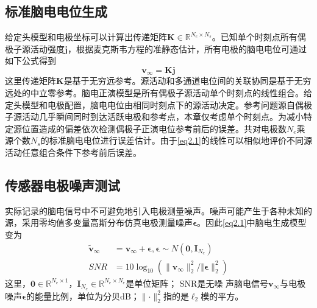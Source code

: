 \subsection{标准脑电电位生成}
给定头模型和电极坐标可以计算出传递矩阵$\mathbf{K}\in{\mathbb{R}^{N_e\times{N_s}}}$。已知单个时刻点所有偶极子源活动强度$\mathbf{j}$，根据麦克斯韦方程的准静态估计，所有电极的脑电电位可通过如下公式得到
\begin{equation}\label{eq2.1}
\mathbf{v}_{\infty}=\mathbf{Kj}
\end{equation}
这里传递矩阵$\mathbf{K}$是基于无穷远参考。源活动和多通道电位间的关联协同是基于无穷远处的中立零参考。脑电正演模型是所有偶极子源活动单个时刻点的线性组合。给定头模型和电极配置，脑电电位由相同时刻点下的源活动决定。参考问题源自偶极子源活动几乎瞬间同时到达活跃电极和参考点，本章仅考虑单个时刻点。为减小特定源位置造成的偏差依次检测偶极子正演电位参考前后的误差。共对电极数$N_e$乘源个数$N_s$的标准脑电电位进行误差估计。由于\eqref{eq2.1}的线性可以相似地评价不同源活动任意组合条件下参考前后误差。
\subsection{传感器电极噪声测试}
实际记录的脑电信号中不可避免地引入电极测量噪声。噪声可能产生于各种未知的源，采用零均值多变量高斯分布仿真电极测量噪声$\mathbf{\epsilon}$。因此\eqref{eq2.1}中脑电生成模型变为
\begin{equation}\label{eq2.2}
\begin{aligned}
\tilde{\mathbf{v}}_\infty& =\mathbf{v}_{\infty}+\mathbf{\epsilon},\mathbf{\epsilon}\sim{N(\mathbf{0},\mathbf{I}_{N_e})}\\
SNR& =10\log_{10}(\lVert{\mathbf{v}_\infty}\rVert_2^2/\Vert{\mathbf{\epsilon}}\rVert_2^2)
\end{aligned}
\end{equation}
这里，$\mathbf{0}\in{\mathbb{R}^{N_e\times1}}$，$\mathbf{I}_{N_e}\in{\mathbb{R}^{N_e\times{N_e}}}$是单位矩阵； SNR是无噪
声脑电信号$\mathbf{v}_{\infty}$与电极噪声$\mathbf{\epsilon}$的能量比例，单位为分贝dB；$\lVert{\cdot}\rVert_2^2$指的是$\ell_2$模的平方。
